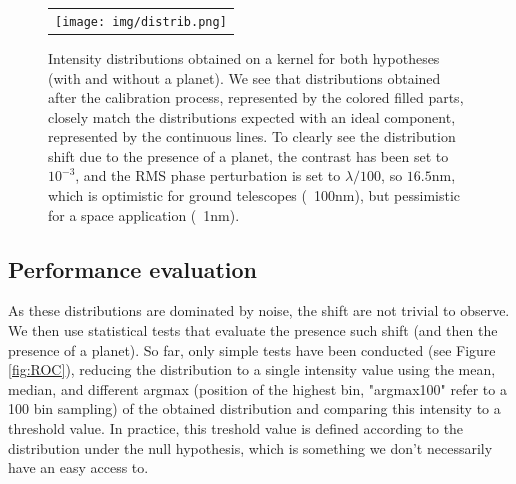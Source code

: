 \documentclass[]{spie}  %
\begin{document}
\begin{figure} [H]
    \begin{center}
    \begin{tabular}{c}
    \texttt{[image: img/distrib.png]}
    \end{tabular}
    \end{center}
    \caption[distrib] 
    { \label{fig:distrib} 
    Intensity distributions obtained on a kernel for both hypotheses (with and without a planet). We see that distributions obtained after the calibration process, represented by the colored filled parts, closely match the distributions expected with an ideal component, represented by the continuous lines. To clearly see the distribution shift due to the presence of a planet, the contrast has been set to $10^{-3}$, and the RMS phase perturbation is set to $\lambda / 100$, so $16.5$nm, which is optimistic for ground telescopes (~100nm), but pessimistic for a space application (~1nm).}
\end{figure}

\subsection*{Performance evaluation}

As these distributions are dominated by noise, the shift are not trivial to observe. We then use statistical tests that evaluate the presence such shift (and then the presence of a planet). So far, only simple tests have been conducted (see Figure \ref{fig:ROC}), reducing the distribution to a single intensity value using the mean, median, and different argmax (position of the highest bin, "argmax100" refer to a 100 bin sampling) of the obtained distribution and comparing this intensity to a threshold value. In practice, this treshold value is defined according to the distribution under the null hypothesis, which is something we don't necessarily have an easy access to.
\end{document}
